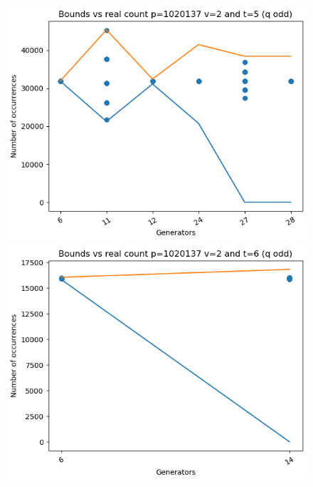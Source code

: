\documentclass{article}
\begin{document}
\begin{figure}[H]
\begin{minipage}{.49\textwidth}
            \includegraphics[width=\textwidth]{../plots/tuples_figures/1020137v2qodd/test_p1020137_v2_t5_q_odd.png}
            \includegraphics[width=\textwidth]{../plots/tuples_figures/1020137v2qodd/test_p1020137_v2_t6_q_odd.png}
    \end{minipage}
\end{figure}
\end{document}
